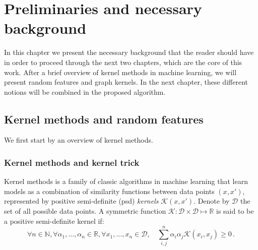 \newcommand{\todoNK}[1]{\textbf{\textcolor{red}{NK: #1}}}
\chapter{Preliminaries and necessary background}
\label{chapter:background}
\newtheorem{theorem}{Theorem}
In this chapter we present the necessary background that the reader should have in order to proceed through the next two chapters, which are the core of this work. After a brief overview of kernel methods in machine learning, we will present random features and graph kernels. In the next chapter, these different notions will be combined in the proposed algorithm.
\section{Kernel methods and random features}

We first start by an overview of kernel methods.

\subsection{Kernel methods and kernel trick}
Kernel methods is a family of classic algorithms in machine learning that learn models as a combination of similarity functions between data points $(x,x')$, represented by positive semi-definite (psd) \emph{kernels} $\mathcal{K}(x,x')$. Denote by $\mathcal{D}$ the set of all possible data points. A symmetric function $\mathcal{K}:\mathcal{D}\times\mathcal{D}\mapsto\mathbb{R}$ is said to be a positive semi-definite kernel if:
\begin{equation}
\forall n\in \mathbb{N}, \forall \alpha_1,\ldots,\alpha_n\in \mathbb{R},\forall x_1,\ldots,x_n\in \mathcal{D},\quad \sum_{i,j}^n\alpha_i\alpha_j\mathcal{K}(x_i,x_j)\geq 0 \, .
\end{equation}

